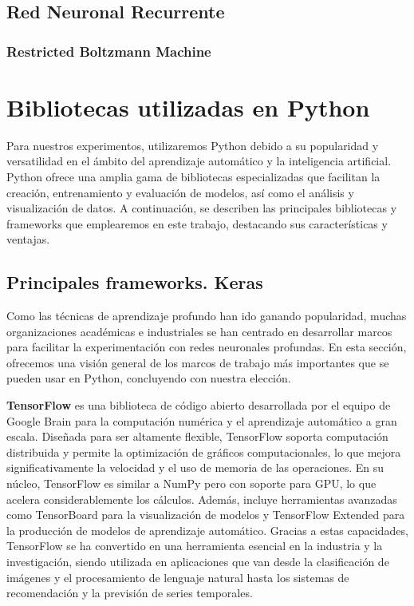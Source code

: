 \subsection{Red Neuronal Recurrente}
\subsubsection{Restricted Boltzmann Machine}









\section{Bibliotecas utilizadas en Python} \label{Subsec: 3_3}

Para nuestros experimentos, utilizaremos Python debido a su popularidad y versatilidad en el ámbito del aprendizaje automático y la inteligencia artificial. Python ofrece una amplia gama de bibliotecas especializadas que facilitan la creación, entrenamiento y evaluación de modelos, así como el análisis y visualización de datos. A continuación, se describen las principales bibliotecas y frameworks que emplearemos en este trabajo, destacando sus características y ventajas.


\subsection{Principales frameworks. Keras}

Como las técnicas de aprendizaje profundo han ido ganando popularidad, muchas organizaciones académicas e industriales se han centrado en desarrollar marcos para facilitar la experimentación con redes neuronales profundas. En esta sección, ofrecemos una visión general de los marcos de trabajo más importantes que se pueden usar en Python, concluyendo con nuestra elección.


\textbf{TensorFlow} \citep{tensorflow} es una biblioteca de código abierto desarrollada por el equipo de Google Brain para la computación numérica y el aprendizaje automático a gran escala. Diseñada para ser altamente flexible, TensorFlow soporta computación distribuida y permite la optimización de gráficos computacionales, lo que mejora significativamente la velocidad y el uso de memoria de las operaciones. En su núcleo, TensorFlow es similar a NumPy pero con soporte para GPU, lo que acelera considerablemente los cálculos. Además, incluye herramientas avanzadas como TensorBoard para la visualización de modelos y TensorFlow Extended para la producción de modelos de aprendizaje automático. Gracias a estas capacidades, TensorFlow se ha convertido en una herramienta esencial en la industria y la investigación, siendo utilizada en aplicaciones que van desde la clasificación de imágenes y el procesamiento de lenguaje natural hasta los sistemas de recomendación y la previsión de series temporales.


